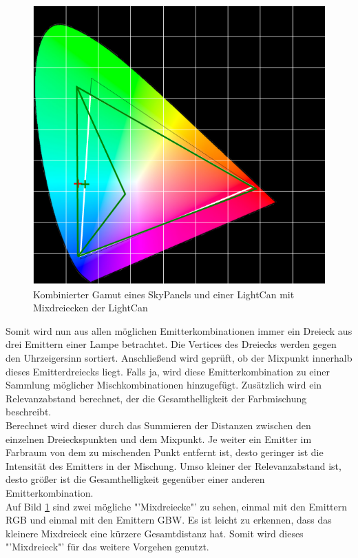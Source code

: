 \documentclass[11pt]{scrartcl}
\begin{document}
\begin{figure}[H]
    \begin{center}
        \includegraphics[width=.8\textwidth]{images/combined_gamut_with_mix_triangles_cyan.png} %
    \end{center}
    \caption{Kombinierter Gamut eines SkyPanels und einer LightCan mit Mixdreiecken der LightCan}\label{fig:triangleCombined}
\end{figure}
\noindent
Somit wird nun aus allen möglichen Emitterkombinationen immer ein Dreieck aus drei Emittern einer Lampe betrachtet. Die Vertices des Dreiecks werden gegen
den Uhrzeigersinn sortiert. Anschließend wird geprüft, ob der Mixpunkt innerhalb dieses Emitterdreiecks liegt. Falls ja, wird diese Emitterkombination zu einer
Sammlung möglicher Mischkombinationen hinzugefügt. Zusätzlich wird ein Relevanzabstand berechnet, der die Gesamthelligkeit der Farbmischung beschreibt.\\
Berechnet wird dieser durch das Summieren der Distanzen zwischen den einzelnen Dreieckspunkten und dem Mixpunkt. Je weiter ein Emitter im Farbraum von dem zu
mischenden Punkt entfernt ist, desto geringer ist die Intensität des Emitters in der Mischung. Umso kleiner der Relevanzabstand ist, desto größer ist die Gesamthelligkeit gegenüber einer anderen Emitterkombination.\\
Auf Bild \ref{fig:triangleCombined} sind zwei mögliche "'Mixdreiecke"' zu sehen, einmal mit den Emittern RGB und einmal mit den Emittern GBW. Es ist leicht
zu erkennen, dass das kleinere Mixdreieck eine kürzere Gesamtdistanz hat. Somit wird dieses "'Mixdreieck"' für das weitere Vorgehen genutzt.\\
\end{document}
